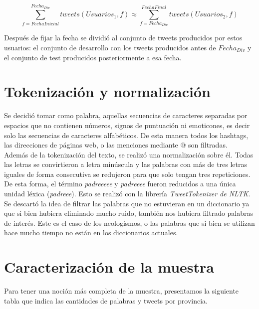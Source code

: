 \begin{equation}
\sum_{ f = FechaInicial}^{Fecha_{Div}} tweets(Usuarios_1,f) \approx \sum_{ f = Fecha_{Div}}^{FechaFinal} tweets(Usuarios_2,f) 
\end{equation}

Después de fijar la fecha se dividió al conjunto de tweets producidos por estos usuarios: el conjunto de desarrollo con los tweets producidos antes de $Fecha_{Div}$ y el conjunto de test producidos posteriormente a esa fecha.

\section{Tokenización y normalización}

Se decidió tomar como palabra, aquellas secuencias de caracteres separadas por espacios que no contienen números, 
signos de puntuación ni emoticones, es decir solo las secuencias de caracteres alfabéticos. De esta manera todos los hashtags, las direcciones de páginas web, o las menciones mediante @ son filtradas.\\
Además de la tokenización del texto, se realizó una normalización sobre él. Todas las letras se convirtieron a letra minúscula y las palabras con más de tres letras iguales de forma consecutiva se redujeron para que solo tengan tres repeticiones. De esta forma, el término \textit{padreeeee} y \textit{padreeee} fueron reducidos a una única unidad léxica (\textit{padreee}). Esto se realizó con la librería \textit{TweetTokenizer de NLTK}. 
Se descartó la idea de filtrar las palabras que no estuvieran en un diccionario ya que si bien hubiera eliminado mucho ruido, también nos hubiera filtrado palabras de interés. Este es el caso de los neologismos, o las palabras que si bien se utilizan hace mucho tiempo no están en los diccionarios actuales.

\section{Caracterización de la muestra}

Para tener una noción más completa de la muestra, presentamos la siguiente tabla que indica las cantidades de palabras y tweets por provincia.


